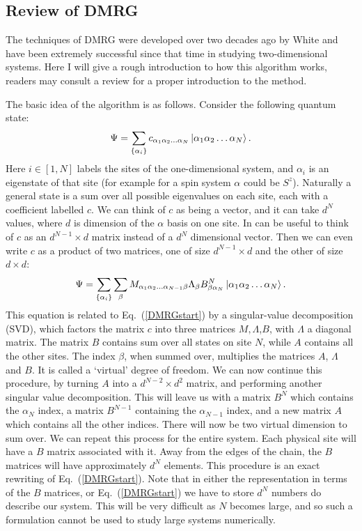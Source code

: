 \subsection{Review of DMRG}

The techniques of DMRG were developed over two decades ago by White\cite{WhiteDMRG} and have been extremely successful since that time in studying two-dimensional systems. Here I will give a rough introduction to how this algorithm works, readers may consult a review for a proper introduction to the method\cite{Schollwock}.

The basic idea of the algorithm is as follows. Consider the following quantum state:
\begin{equation}
\Psi=\sum_{\{\alpha_i\}} c_{\alpha_1\alpha_2\ldots\alpha_N}\ket{\alpha_1\alpha_2\ldots\alpha_N}.
\label{DMRGstart}
\end{equation}
Here $i\in[1,N]$ labels the sites of the one-dimensional system, and $\alpha_i$ is an eigenstate of that site (for example for a spin system $\alpha$ could be $S^z$). Naturally a general state is a sum over all possible eigenvalues on each site, each with a coefficient labelled $c$. We can think of $c$ as being a vector, and it can take $d^N$ values, where $d$ is dimension of the $\alpha$ basis on one site. In can be useful to think of $c$ as an $d^{N-1}\times d$ matrix instead of a $d^N$ dimensional vector. Then we can even write $c$ as a product of two matrices, one of size $d^{N-1}\times d$ and the other of size $d\times d$:
\begin{equation}
\Psi=\sum_{\{\alpha_i\}}\sum_\beta M_{\alpha_1\alpha_2\ldots\alpha_{N-1}\beta}\Lambda_\beta B^N_{\beta\alpha_N}\ket{\alpha_1\alpha_2\ldots\alpha_N}.
\end{equation}
This equation is related to Eq.~(\ref{DMRGstart}) by a singular-value decomposition (SVD), which factors the matrix $c$ into three matrices $M,\Lambda$,$B$, with $\Lambda$ a diagonal matrix. The matrix $B$ contains sum over all states on site $N$, while $A$ contains all the other sites. The index $\beta$, when summed over, multiplies the matrices $A$, $\Lambda$ and $B$. It is called a `virtual' degree of freedom. We can now continue this procedure, by turning $A$ into a $d^{N-2}\times d^2$ matrix, and performing another singular value decomposition. This will leave us with a matrix $B^N$ which contains the $\alpha_N$ index, a matrix $B^{N-1}$ containing the $\alpha_{N-1}$ index, and a new matrix $A$ which contains all the other indices. There will now be two virtual dimension to sum over. We can repeat this process for the entire system. Each physical site will have a $B$ matrix associated with it. Away from the edges of the chain, the $B$ matrices will have approximately $d^N$ elements. This procedure is an exact rewriting of Eq.~(\ref{DMRGstart}). Note that in either the representation in terms of the $B$ matrices, or Eq.~(\ref{DMRGstart}) we have to store $d^N$ numbers do describe our system. This will be very difficult as $N$ becomes large, and so such a formulation cannot be used to study large systems numerically.

